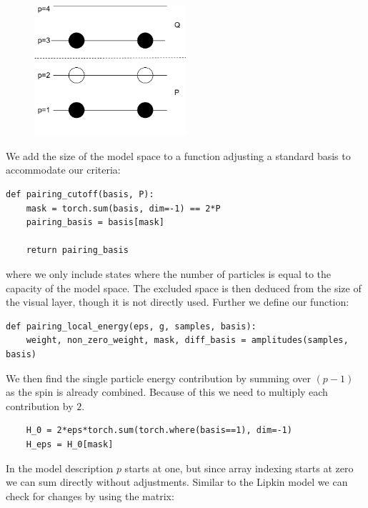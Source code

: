 \vspace{\baselineskip}
\\
\begin{figure}[H]
  \begin{center}
    \includegraphics[width=0.5\textwidth]{Figures/Drawn/Pairing/pairing_imp_exp.pdf}
  \end{center}
\end{figure}

We add the size of the model space to a function adjusting a standard basis to accommodate our criteria:

\begin{verbatim}  
def pairing_cutoff(basis, P):
    mask = torch.sum(basis, dim=-1) == 2*P
    pairing_basis = basis[mask]

    return pairing_basis
\end{verbatim}

where we only include states where the number of particles is equal to the capacity of the model space. The excluded space is then deduced from the size of the visual layer, though it is not directly used. Further we define our function:

\begin{verbatim}
def pairing_local_energy(eps, g, samples, basis):    
    weight, non_zero_weight, mask, diff_basis = amplitudes(samples, basis)
\end{verbatim}

We then find the single particle energy contribution by summing over $(p-1)$ as the spin is already combined. Because of this we need to multiply each contribution by $2$.

\begin{verbatim} 
    H_0 = 2*eps*torch.sum(torch.where(basis==1), dim=-1) 
    H_eps = H_0[mask]
\end{verbatim}

In the model description $p$ starts at one, but since array indexing starts at zero we can sum directly without adjustments. Similar to the Lipkin model we can check for changes by using the  matrix:

